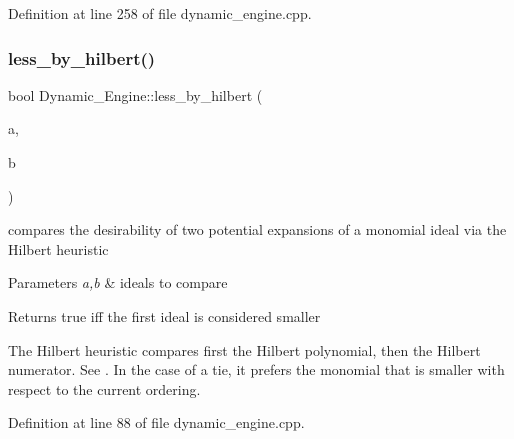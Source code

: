 Definition at line 258 of file dynamic\+\_\+engine.\+cpp.

\mbox{\label{namespace_dynamic___engine_acb9d5de295d3d96abfa40dd47ae41c1f}} 
\subsubsection{\texorpdfstring{less\+\_\+by\+\_\+hilbert()}{less\_by\_hilbert()}}
{\footnotesize\ttfamily bool Dynamic\+\_\+\+Engine\+::less\+\_\+by\+\_\+hilbert (\begin{DoxyParamCaption}\item[{\hyperlink{group___g_b_computation_class_dynamic___engine_1_1_p_p___with___ideal}{P\+P\+\_\+\+With\+\_\+\+Ideal} \&}]{a,  }\item[{\hyperlink{group___g_b_computation_class_dynamic___engine_1_1_p_p___with___ideal}{P\+P\+\_\+\+With\+\_\+\+Ideal} \&}]{b }\end{DoxyParamCaption})}



compares the desirability of two potential expansions of a monomial ideal via the Hilbert heuristic 


\begin{DoxyParams}{Parameters}
{\em a,b} & ideals to compare \\
\hline
\end{DoxyParams}
\begin{DoxyReturn}{Returns}
{\ttfamily true} iff the first ideal is considered smaller
\end{DoxyReturn}
The Hilbert heuristic compares first the Hilbert polynomial, then the Hilbert numerator. See \cite{CaboaraDynAlg}. In the case of a tie, it prefers the monomial that is smaller with respect to the current ordering. 

Definition at line 88 of file dynamic\+\_\+engine.\+cpp.

\mbox{\label{namespace_dynamic___engine_afe48703afece2137e511824b00ccad39}} 
